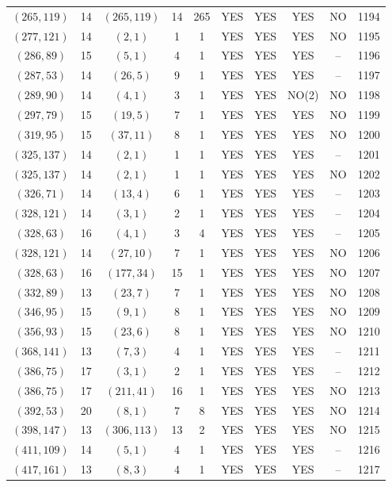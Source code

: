 \begin{longtable}{|c|c|c|c|c|c|c|c|c|c|}
$(265, 119)$ & 14 & $(265, 119)$ & 14 & 265 & YES & YES & YES & NO & 1194\\
$(277, 121)$ & 14 & $(2, 1)$ & 1 & 1 & YES & YES & YES & NO & 1195\\
$(286, 89)$ & 15 & $(5, 1)$ & 4 & 1 & YES & YES & YES & -- & 1196\\
$(287, 53)$ & 14 & $(26, 5)$ & 9 & 1 & YES & YES & YES & -- & 1197\\
$(289, 90)$ & 14 & $(4, 1)$ & 3 & 1 & YES & YES & NO(2) & NO & 1198\\
$(297, 79)$ & 15 & $(19, 5)$ & 7 & 1 & YES & YES & YES & NO & 1199\\
$(319, 95)$ & 15 & $(37, 11)$ & 8 & 1 & YES & YES & YES & NO & 1200\\
$(325, 137)$ & 14 & $(2, 1)$ & 1 & 1 & YES & YES & YES & -- & 1201\\
$(325, 137)$ & 14 & $(2, 1)$ & 1 & 1 & YES & YES & YES & NO & 1202\\
$(326, 71)$ & 14 & $(13, 4)$ & 6 & 1 & YES & YES & YES & -- & 1203\\
$(328, 121)$ & 14 & $(3, 1)$ & 2 & 1 & YES & YES & YES & -- & 1204\\
$(328, 63)$ & 16 & $(4, 1)$ & 3 & 4 & YES & YES & YES & -- & 1205\\
$(328, 121)$ & 14 & $(27, 10)$ & 7 & 1 & YES & YES & YES & NO & 1206\\
$(328, 63)$ & 16 & $(177, 34)$ & 15 & 1 & YES & YES & YES & NO & 1207\\
$(332, 89)$ & 13 & $(23, 7)$ & 7 & 1 & YES & YES & YES & NO & 1208\\
$(346, 95)$ & 15 & $(9, 1)$ & 8 & 1 & YES & YES & YES & NO & 1209\\
$(356, 93)$ & 15 & $(23, 6)$ & 8 & 1 & YES & YES & YES & NO & 1210\\
$(368, 141)$ & 13 & $(7, 3)$ & 4 & 1 & YES & YES & YES & -- & 1211\\
$(386, 75)$ & 17 & $(3, 1)$ & 2 & 1 & YES & YES & YES & -- & 1212\\
$(386, 75)$ & 17 & $(211, 41)$ & 16 & 1 & YES & YES & YES & NO & 1213\\
$(392, 53)$ & 20 & $(8, 1)$ & 7 & 8 & YES & YES & YES & NO & 1214\\
$(398, 147)$ & 13 & $(306, 113)$ & 13 & 2 & YES & YES & YES & NO & 1215\\
$(411, 109)$ & 14 & $(5, 1)$ & 4 & 1 & YES & YES & YES & -- & 1216\\
$(417, 161)$ & 13 & $(8, 3)$ & 4 & 1 & YES & YES & YES & -- & 1217\\

\end{longtable}
